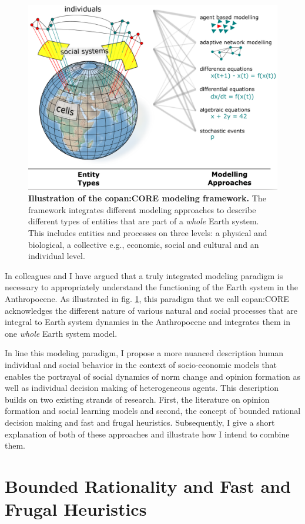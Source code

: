 \begin{figure}[t]
  \centering
  \includegraphics[width = .8 \textwidth]{figures/CORE.png}
  \caption{\textbf{Illustration of the copan:CORE modeling framework.} The framework integrates different modeling approaches to describe different types of entities that are part of a \emph{whole} Earth system. This includes entities and processes on three levels: a physical and biological, a collective e.g., economic, social and cultural and an individual level.}
  \label{fig:Core}
\end{figure}
In \citep{Donges2018} colleagues and I have argued that a truly integrated modeling paradigm is necessary to appropriately understand the functioning of the Earth system in the Anthropocene. As illustrated in fig. \ref{fig:Core}, this paradigm that we call copan:CORE acknowledges the different nature of various natural and social processes that are integral to Earth system dynamics in the Anthropocene and integrates them in one \emph{whole} Earth system model.

In line this modeling paradigm, I propose a more nuanced description human individual and social behavior in the context of socio-economic models that enables the portrayal of social dynamics of norm change and opinion formation as well as individual decision making of heterogeneous agents.
This description builds on two existing strands of research. First, the literature on opinion formation and social learning models and second, the concept of bounded rational decision making and fast and frugal heuristics. Subsequently, I give a short explanation of both of these approaches and illustrate how I intend to combine them.

\section{Bounded Rationality and Fast and Frugal Heuristics}
\label{sec:intro_bounded_rationality}


